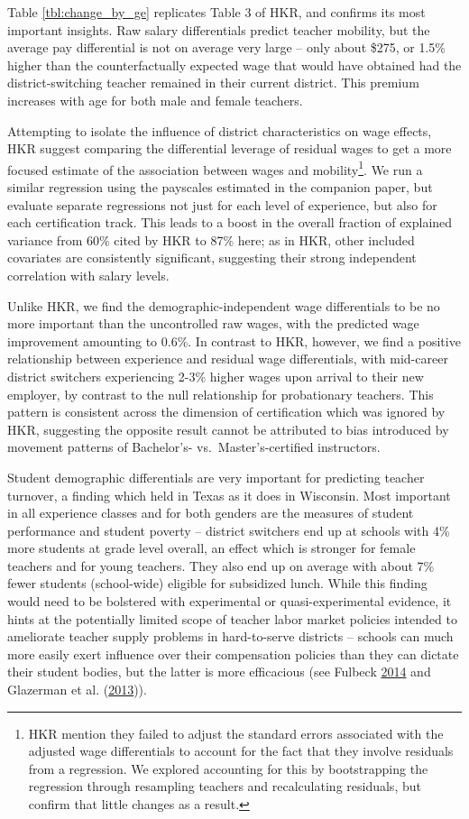 \documentclass[12pt,]{article}
\let\rmarkdownfootnote\footnote%
\def\footnote{\protect\rmarkdownfootnote}
\begin{document}
Table \ref{tbl:change_by_ge} replicates Table 3 of HKR, and confirms its
most important insights. Raw salary differentials predict teacher
mobility, but the average pay differential is not on average very large
-- only about \$275, or 1.5\% higher than the counterfactually expected
wage that would have obtained had the district-switching teacher
remained in their current district. This premium increases with age for
both male and female teachers.

Attempting to isolate the influence of district characteristics on wage
effects, HKR suggest comparing the differential leverage of residual
wages to get a more focused estimate of the association between wages
and mobility\footnote{HKR mention they failed to adjust the standard
  errors associated with the adjusted wage differentials to account for
  the fact that they involve residuals from a regression. We explored
  accounting for this by bootstrapping the regression through resampling
  teachers and recalculating residuals, but confirm that little changes
  as a result.}. We run a similar regression using the payscales
estimated in the companion paper, but evaluate separate regressions not
just for each level of experience, but also for each certification
track. This leads to a boost in the overall fraction of explained
variance from 60\% cited by HKR to 87\% here; as in HKR, other included
covariates are consistently significant, suggesting their strong
independent correlation with salary levels.

Unlike HKR, we find the demographic-independent wage differentials to be
no more important than the uncontrolled raw wages, with the predicted
wage improvement amounting to 0.6\%. In contrast to HKR, however, we
find a positive relationship between experience and residual wage
differentials, with mid-career district switchers experiencing 2-3\%
higher wages upon arrival to their new employer, by contrast to the null
relationship for probationary teachers. This pattern is consistent
across the dimension of certification which was ignored by HKR,
suggesting the opposite result cannot be attributed to bias introduced
by movement patterns of Bachelor's- vs.~Master's-certified instructors.

Student demographic differentials are very important for predicting
teacher turnover, a finding which held in Texas as it does in Wisconsin.
Most important in all experience classes and for both genders are the
measures of student performance and student poverty -- district
switchers end up at schools with 4\% more students at grade level
overall, an effect which is stronger for female teachers and for young
teachers. They also end up on average with about 7\% fewer students
(school-wide) eligible for subsidized lunch. While this finding would
need to be bolstered with experimental or quasi-experimental evidence,
it hints at the potentially limited scope of teacher labor market
policies intended to ameliorate teacher supply problems in hard-to-serve
districts -- schools can much more easily exert influence over their
compensation policies than they can dictate their student bodies, but
the latter is more efficacious (see Fulbeck
\protect\hyperlink{ref-fulbeck}{2014} and Glazerman et al.
(\protect\hyperlink{ref-glazerman}{2013})).
\end{document}
